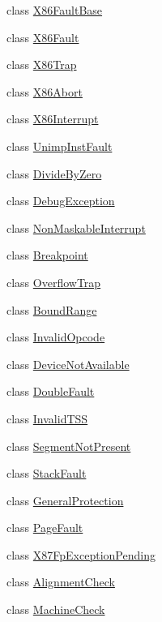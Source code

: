 \begin{DoxyCompactItemize}
\item 
class \hyperlink{classX86ISA_1_1X86FaultBase}{X86FaultBase}
\item 
class \hyperlink{classX86ISA_1_1X86Fault}{X86Fault}
\item 
class \hyperlink{classX86ISA_1_1X86Trap}{X86Trap}
\item 
class \hyperlink{classX86ISA_1_1X86Abort}{X86Abort}
\item 
class \hyperlink{classX86ISA_1_1X86Interrupt}{X86Interrupt}
\item 
class \hyperlink{classX86ISA_1_1UnimpInstFault}{UnimpInstFault}
\item 
class \hyperlink{classX86ISA_1_1DivideByZero}{DivideByZero}
\item 
class \hyperlink{classX86ISA_1_1DebugException}{DebugException}
\item 
class \hyperlink{classX86ISA_1_1NonMaskableInterrupt}{NonMaskableInterrupt}
\item 
class \hyperlink{classX86ISA_1_1Breakpoint}{Breakpoint}
\item 
class \hyperlink{classX86ISA_1_1OverflowTrap}{OverflowTrap}
\item 
class \hyperlink{classX86ISA_1_1BoundRange}{BoundRange}
\item 
class \hyperlink{classX86ISA_1_1InvalidOpcode}{InvalidOpcode}
\item 
class \hyperlink{classX86ISA_1_1DeviceNotAvailable}{DeviceNotAvailable}
\item 
class \hyperlink{classX86ISA_1_1DoubleFault}{DoubleFault}
\item 
class \hyperlink{classX86ISA_1_1InvalidTSS}{InvalidTSS}
\item 
class \hyperlink{classX86ISA_1_1SegmentNotPresent}{SegmentNotPresent}
\item 
class \hyperlink{classX86ISA_1_1StackFault}{StackFault}
\item 
class \hyperlink{classX86ISA_1_1GeneralProtection}{GeneralProtection}
\item 
class \hyperlink{classX86ISA_1_1PageFault}{PageFault}
\item 
class \hyperlink{classX86ISA_1_1X87FpExceptionPending}{X87FpExceptionPending}
\item 
class \hyperlink{classX86ISA_1_1AlignmentCheck}{AlignmentCheck}
\item 
class \hyperlink{classX86ISA_1_1MachineCheck}{MachineCheck}
\item 

\end{DoxyCompactItemize}
